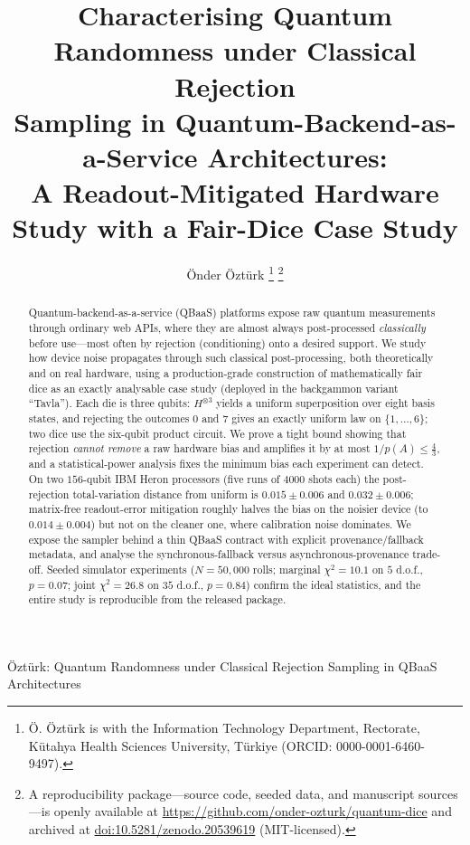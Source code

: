 \documentclass[journal]{IEEEtran}
\begin{document}
\title{Characterising Quantum Randomness under Classical Rejection\\
Sampling in Quantum-Backend-as-a-Service Architectures:\\
A Readout-Mitigated Hardware Study with a Fair-Dice Case Study}

\author{Önder Öztürk%
\thanks{Ö. Öztürk is with the Information Technology Department, Rectorate, Kütahya Health Sciences University, Türkiye (ORCID: 0000-0001-6460-9497).}%
\thanks{A reproducibility package---source code, seeded data, and manuscript sources---is openly available at \url{https://github.com/onder-ozturk/quantum-dice} and archived at \href{https://doi.org/10.5281/zenodo.20539619}{doi:10.5281/zenodo.20539619} (MIT-licensed).}}

%
{Öztürk: Quantum Randomness under Classical Rejection Sampling in QBaaS Architectures}

\maketitle

\begin{abstract}
Quantum-backend-as-a-service (QBaaS) platforms expose raw quantum measurements through ordinary web APIs, where they are almost always post-processed \emph{classically} before use---most often by rejection (conditioning) onto a desired support. We study how device noise propagates through such classical post-processing, both theoretically and on real hardware, using a production-grade construction of mathematically fair dice as an exactly analysable case study (deployed in the backgammon variant ``Tavla''). Each die is three qubits: $H^{\otimes 3}$ yields a uniform superposition over eight basis states, and rejecting the outcomes $0$ and $7$ gives an exactly uniform law on $\{1,\dots,6\}$; two dice use the six-qubit product circuit. We prove a tight bound showing that rejection \emph{cannot remove} a raw hardware bias and amplifies it by at most $1/p(A)\le\tfrac43$, and a statistical-power analysis fixes the minimum bias each experiment can detect. On two $156$-qubit IBM Heron processors (five runs of $4000$ shots each) the post-rejection total-variation distance from uniform is $0.015\pm0.006$ and $0.032\pm0.006$; matrix-free readout-error mitigation roughly halves the bias on the noisier device (to $0.014\pm0.004$) but not on the cleaner one, where calibration noise dominates. We expose the sampler behind a thin QBaaS contract with explicit provenance/fallback metadata, and analyse the synchronous-fallback versus asynchronous-provenance trade-off. Seeded simulator experiments ($N=50{,}000$ rolls; marginal $\chi^2=10.1$ on $5$ d.o.f., $p=0.07$; joint $\chi^2=26.8$ on $35$ d.o.f., $p=0.84$) confirm the ideal statistics, and the entire study is reproducible from the released package.
\end{abstract}
\end{document}
